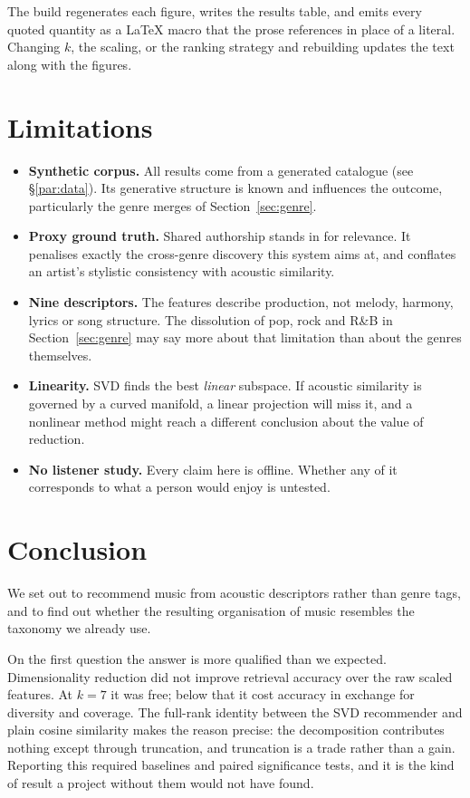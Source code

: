 \documentclass[11pt]{article}
\begin{document}
The build regenerates each figure, writes the results table, and emits every
quoted quantity as a LaTeX macro that the prose references in place of a
literal. Changing $k$, the scaling, or the ranking strategy and rebuilding
updates the text along with the figures.

\section{Limitations}

\begin{itemize}
  \item \textbf{Synthetic corpus.} All results come from a generated catalogue
        (see \S\ref{par:data}). Its generative structure is known and
        influences the outcome, particularly the genre merges of
        Section~\ref{sec:genre}.
  \item \textbf{Proxy ground truth.} Shared authorship stands in for relevance.
        It penalises exactly the cross-genre discovery this system aims at, and
        conflates an artist's stylistic consistency with acoustic similarity.
  \item \textbf{Nine descriptors.} The features describe production, not
        melody, harmony, lyrics or song structure. The dissolution of pop, rock
        and R\&B in Section~\ref{sec:genre} may say more about that limitation
        than about the genres themselves.
  \item \textbf{Linearity.} SVD finds the best \emph{linear} subspace. If
        acoustic similarity is governed by a curved manifold, a linear
        projection will miss it, and a nonlinear method might reach a different
        conclusion about the value of reduction.
  \item \textbf{No listener study.} Every claim here is offline. Whether any of
        it corresponds to what a person would enjoy is untested.
\end{itemize}

\section{Conclusion}

We set out to recommend music from acoustic descriptors rather than genre tags,
and to find out whether the resulting organisation of music resembles the
taxonomy we already use.

On the first question the answer is more qualified than we expected.
Dimensionality reduction did not improve retrieval accuracy over the raw scaled
features. At $k=7$ it was free; below that it cost accuracy in exchange for
diversity and coverage. The full-rank identity between the SVD recommender and
plain cosine similarity makes the reason precise: the decomposition contributes
nothing except through truncation, and truncation is a trade rather than a
gain. Reporting this required baselines and paired significance tests, and it
is the kind of result a project without them would not have found.
\end{document}
